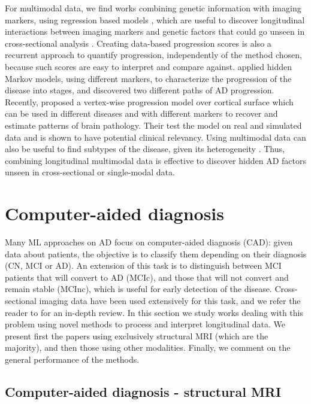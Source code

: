 For multimodal data, we find works combining genetic information with imaging markers, using regression based models \cite{Silver2012,Vounou2012}, which are useful to discover longitudinal interactions between imaging markers and genetic factors that could go unseen in cross-sectional analysis \cite{Xu2014}. Creating data-based progression scores \cite{Casanova2018,Clark2012,Davatzikos2009,Jedynak2012,Schmidt-Richberg2015} is also a recurrent approach to quantify progression, independently of the method chosen, because such scores are easy to interpret and compare against. \cite{Goyal2018b} applied hidden Markov models, using different markers, to characterize the progression of the disease into stages, and discovered two different paths of AD progression. Recently, \cite{Marinescu2019} proposed a vertex-wise progression model over cortical surface which can be used in different diseases and with different markers to recover and estimate patterns of brain pathology. Their test the model on real and simulated data and is shown to have potential clinical relevancy. Using multimodal data can also be useful to find subtypes of the disease, given its heterogeneity \cite{Gamberger2017}. Thus, combining longitudinal multimodal data is effective to discover hidden AD factors unseen in cross-sectional or single-modal data. \\

\section{Computer-aided diagnosis}
\label{sec:classification}

Many ML approaches on AD focus on computer-aided diagnosis (CAD): given data about patients, the objective is to classify them depending on their diagnosis (CN, MCI or AD). An extension of this task is to distinguish between MCI patients that will convert to AD (MCIc), and those that will not convert and remain stable (MCInc), which is useful for early detection of the disease. Cross-sectional imaging data have been used extensively for this task, and we refer the reader to \cite{Rathore2017} for an in-depth review. In this section we study works dealing with this problem using novel methods to process and interpret longitudinal data. We present first the papers using exclusively structural MRI (which are the majority), and then those using other modalities. Finally, we comment on the general performance of the methods. \\

\subsection{Computer-aided diagnosis - structural MRI}

